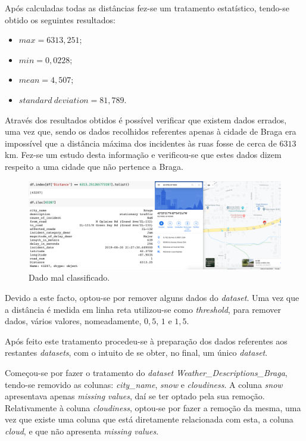 \documentclass[a4paper, 12pt]{article}
\begin{document}
Após calculadas todas as distâncias fez-se um tratamento estatístico, tendo-se obtido os seguintes resultados:

\begin{itemize}
	\item ${max}= 6313,251$;
	\item ${min}= 0,0228$;
	\item ${mean}= 4,507$;
	\item ${standard \ deviation}= 81,789$.
\end{itemize}

Através dos resultados obtidos é possível verificar que existem dados errados, uma vez que, sendo os dados recolhidos referentes apenas à cidade de Braga era impossível que a distância máxima dos incidentes às ruas fosse de cerca de $6313$ km. Fez-se um estudo desta informação e verificou-se que estes dados dizem respeito a uma cidade que não pertence a Braga.

\begin{figure}[H]
	\centering
	\includegraphics[width=14cm]{EUA}
	\caption{Dado mal classificado.}
\end{figure}

Devido a este facto, optou-se por remover alguns dados do \textit{dataset}. Uma vez que a distância é medida em linha reta utilizou-se como \textit{threshold}, para remover dados, vários valores, nomeadamente, $0,5$, $1$ e $1,5$.

Após feito este tratamento procedeu-se à preparação dos dados referentes aos restantes \textit{datasets}, com o intuito de se obter, no final, um único \textit{dataset}.

Começou-se por fazer o tratamento do \textit{dataset Weather\_Descriptions\_Braga}, tendo-se removido as colunas: \textit{city\_name}, \textit{snow} e \textit{cloudiness}. A coluna \textit{snow} apresentava apenas \textit{missing values}, daí se ter optado pela sua remoção. Relativamente à  coluna \textit{cloudiness}, optou-se por fazer a remoção da mesma, uma vez que existe uma coluna que está diretamente relacionada com esta, a coluna \textit{cloud}, e que não apresenta \textit{missing values}.
\end{document}

